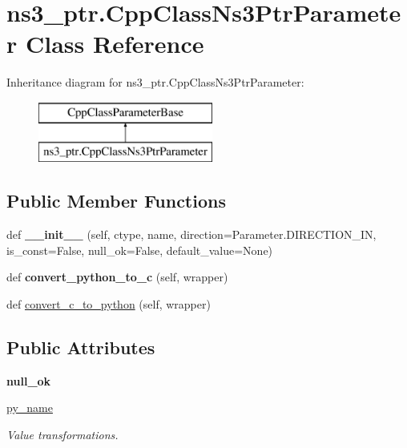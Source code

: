 \hypertarget{classns3__ptr_1_1CppClassNs3PtrParameter}{}\section{ns3\+\_\+ptr.\+Cpp\+Class\+Ns3\+Ptr\+Parameter Class Reference}
\label{classns3__ptr_1_1CppClassNs3PtrParameter}
Inheritance diagram for ns3\+\_\+ptr.\+Cpp\+Class\+Ns3\+Ptr\+Parameter\+:\begin{figure}[H]
\begin{center}
\leavevmode
\includegraphics[height=2.000000cm]{classns3__ptr_1_1CppClassNs3PtrParameter}
\end{center}
\end{figure}
\subsection*{Public Member Functions}
\begin{DoxyCompactItemize}
\item 
def {\bfseries \+\_\+\+\_\+init\+\_\+\+\_\+} (self, ctype, name, direction=Parameter.\+D\+I\+R\+E\+C\+T\+I\+O\+N\+\_\+\+IN, is\+\_\+const=False, null\+\_\+ok=False, default\+\_\+value=None)\hypertarget{classns3__ptr_1_1CppClassNs3PtrParameter_ae24f8bc1ad5114633cb7388c217f3ca1}{}\label{classns3__ptr_1_1CppClassNs3PtrParameter_ae24f8bc1ad5114633cb7388c217f3ca1}

\item 
def {\bfseries convert\+\_\+python\+\_\+to\+\_\+c} (self, wrapper)\hypertarget{classns3__ptr_1_1CppClassNs3PtrParameter_a491acc4d4b648b43bea4da537461e9cc}{}\label{classns3__ptr_1_1CppClassNs3PtrParameter_a491acc4d4b648b43bea4da537461e9cc}

\item 
def \hyperlink{classns3__ptr_1_1CppClassNs3PtrParameter_af46a946d7a7c07895ef66b0e8827f4a7}{convert\+\_\+c\+\_\+to\+\_\+python} (self, wrapper)
\end{DoxyCompactItemize}
\subsection*{Public Attributes}
\begin{DoxyCompactItemize}
\item 
{\bfseries null\+\_\+ok}\hypertarget{classns3__ptr_1_1CppClassNs3PtrParameter_aac95125f62913bd3816eb3982eea932a}{}\label{classns3__ptr_1_1CppClassNs3PtrParameter_aac95125f62913bd3816eb3982eea932a}

\item 
\hyperlink{classns3__ptr_1_1CppClassNs3PtrParameter_a89a3f5832da707413e4eeea4499b5e3a}{py\+\_\+name}
\begin{DoxyCompactList}\small\item\em Value transformations. \end{DoxyCompactList}\end{DoxyCompactItemize}
